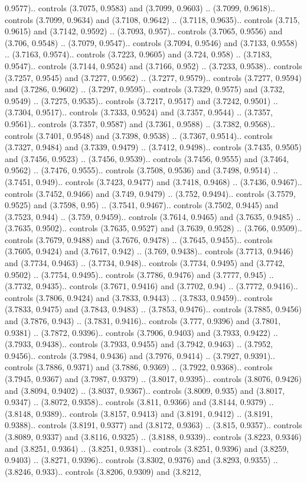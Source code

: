 0.9577).. controls (3.7075, 0.9583) and (3.7099, 0.9603) .. (3.7099, 0.9618).. controls (3.7099, 0.9634) and (3.7108, 0.9642) .. (3.7118, 0.9635).. controls (3.715, 0.9615) and (3.7142, 0.9592) .. (3.7093, 0.957).. controls (3.7065, 0.9556) and (3.706, 0.9548) .. (3.7079, 0.9547).. controls (3.7094, 0.9546) and (3.7133, 0.9558) .. (3.7163, 0.9574).. controls (3.7223, 0.9605) and (3.724, 0.958) .. (3.7183, 0.9547).. controls (3.7144, 0.9524) and (3.7166, 0.952) .. (3.7233, 0.9538).. controls (3.7257, 0.9545) and (3.7277, 0.9562) .. (3.7277, 0.9579).. controls (3.7277, 0.9594) and (3.7286, 0.9602) .. (3.7297, 0.9595).. controls (3.7329, 0.9575) and (3.732, 0.9549) .. (3.7275, 0.9535).. controls (3.7217, 0.9517) and (3.7242, 0.9501) .. (3.7304, 0.9517).. controls (3.7333, 0.9524) and (3.7357, 0.9544) .. (3.7357, 0.9561).. controls (3.7357, 0.9587) and (3.7361, 0.9588) .. (3.7382, 0.9568).. controls (3.7401, 0.9548) and (3.7398, 0.9538) .. (3.7367, 0.9514).. controls (3.7327, 0.9484) and (3.7339, 0.9479) .. (3.7412, 0.9498).. controls (3.7435, 0.9505) and (3.7456, 0.9523) .. (3.7456, 0.9539).. controls (3.7456, 0.9555) and (3.7464, 0.9562) .. (3.7476, 0.9555).. controls (3.7508, 0.9536) and (3.7498, 0.9514) .. (3.7451, 0.949).. controls (3.7423, 0.9477) and (3.7418, 0.9468) .. (3.7436, 0.9467).. controls (3.7452, 0.9466) and (3.749, 0.9479) .. (3.752, 0.9494).. controls (3.7579, 0.9525) and (3.7598, 0.95) .. (3.7541, 0.9467).. controls (3.7502, 0.9445) and (3.7523, 0.944) .. (3.759, 0.9459).. controls (3.7614, 0.9465) and (3.7635, 0.9485) .. (3.7635, 0.9502).. controls (3.7635, 0.9527) and (3.7639, 0.9528) .. (3.766, 0.9509).. controls (3.7679, 0.9488) and (3.7676, 0.9478) .. (3.7645, 0.9455).. controls (3.7605, 0.9424) and (3.7617, 0.942) .. (3.769, 0.9438).. controls (3.7713, 0.9446) and (3.7734, 0.9463) .. (3.7734, 0.948).. controls (3.7734, 0.9495) and (3.7742, 0.9502) .. (3.7754, 0.9495).. controls (3.7786, 0.9476) and (3.7777, 0.945) .. (3.7732, 0.9435).. controls (3.7671, 0.9416) and (3.7702, 0.94) .. (3.7772, 0.9416).. controls (3.7806, 0.9424) and (3.7833, 0.9443) .. (3.7833, 0.9459).. controls (3.7833, 0.9475) and (3.7843, 0.9483) .. (3.7853, 0.9476).. controls (3.7885, 0.9456) and (3.7876, 0.943) .. (3.7831, 0.9416).. controls (3.777, 0.9396) and (3.7801, 0.9381) .. (3.7872, 0.9396).. controls (3.7906, 0.9403) and (3.7933, 0.9422) .. (3.7933, 0.9438).. controls (3.7933, 0.9455) and (3.7942, 0.9463) .. (3.7952, 0.9456).. controls (3.7984, 0.9436) and (3.7976, 0.9414) .. (3.7927, 0.9391).. controls (3.7886, 0.9371) and (3.7886, 0.9369) .. (3.7922, 0.9368).. controls (3.7945, 0.9367) and (3.7987, 0.9379) .. (3.8017, 0.9395).. controls (3.8076, 0.9426) and (3.8094, 0.9402) .. (3.8037, 0.9367).. controls (3.8009, 0.935) and (3.8017, 0.9347) .. (3.8072, 0.9358).. controls (3.811, 0.9366) and (3.8144, 0.9379) .. (3.8148, 0.9389).. controls (3.8157, 0.9413) and (3.8191, 0.9412) .. (3.8191, 0.9388).. controls (3.8191, 0.9377) and (3.8172, 0.9363) .. (3.815, 0.9357).. controls (3.8089, 0.9337) and (3.8116, 0.9325) .. (3.8188, 0.9339).. controls (3.8223, 0.9346) and (3.8251, 0.9364) .. (3.8251, 0.9381).. controls (3.8251, 0.9396) and (3.8259, 0.9403) .. (3.8271, 0.9396).. controls (3.8302, 0.9376) and (3.8293, 0.9355) .. (3.8246, 0.933).. controls (3.8206, 0.9309) and (3.8212, 